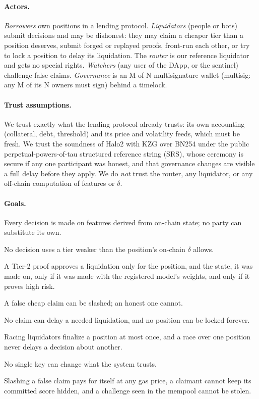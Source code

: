 \documentclass[sigconf,nonacm]{acmart}
\begin{document}
\paragraph{Actors.} \emph{Borrowers} own positions in a lending protocol. \emph{Liquidators} (people or bots) submit decisions and may be dishonest: they may claim a cheaper tier than a position deserves, submit forged or replayed proofs, front-run each other, or try to lock a position to delay its liquidation. The \emph{router} is our reference liquidator and gets no special rights. \emph{Watchers} (any user of the DApp, or the sentinel) challenge false claims. \emph{Governance} is an M-of-N multisignature wallet (multisig: any M of its N owners must sign) behind a timelock.

\paragraph{Trust assumptions.} We trust exactly what the lending protocol already trusts: its own accounting (collateral, debt, threshold) and its price and volatility feeds, which must be fresh. We trust the soundness of Halo2 with KZG over BN254 under the public perpetual-powers-of-tau structured reference string (SRS), whose ceremony is secure if any one participant was honest, and that governance changes are visible a full delay before they apply. We do \emph{not} trust the router, any liquidator, or any off-chain computation of features or $\delta$.

\paragraph{Goals.}
\begin{description}[leftmargin=0pt,itemsep=2pt]
  \item[G1 Input integrity.] Every decision is made on features derived from on-chain state; no party can substitute its own.
  \item[G2 Tier soundness.] No decision uses a tier weaker than the position's on-chain $\delta$ allows.
  \item[G3 Proof binding.] A Tier-2 proof approves a liquidation only for the position, and the state, it was made on, only if it was made with the registered model's weights, and only if it proves high risk.
  \item[G4 Accountability.] A false cheap claim can be slashed; an honest one cannot.
  \item[G5 Liveness.] No claim can delay a needed liquidation, and no position can be locked forever.
  \item[G6 Exactly once.] Racing liquidators finalize a position at most once, and a race over one position never delays a decision about another.
  \item[G7 Governed change.] No single key can change what the system trusts.
  \item[G8 Incentive compatibility.] Slashing a false claim pays for itself at any gas price, a claimant cannot keep its committed score hidden, and a challenge seen in the mempool cannot be stolen.
\end{description}
\end{document}
